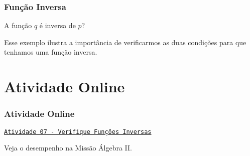 \documentclass[brazil, notheorems, 10pt]{beamer}
\begin{document}


\begin{frame}
\frametitle{Função Inversa} %

\begin{exemplo}
A função $q$ é inversa de $p$?
\end{exemplo}\pause
 Esse exemplo ilustra a importância de verificarmos as duas
 condições para que tenhamos uma função inversa.

\end{frame}

\section{Atividade Online}
\begin{frame}
\frametitle{Atividade Online} %

\href{https://pt.khanacademy.org/math/algebra2/manipulating-functions/verifying-that-functions-are-inverses/e/inverses_of_functions}
{{\tt Atividade 07 - Verifique Funções Inversas}}


Veja o desempenho na Missão Álgebra II.


\end{frame}
\end{document}
